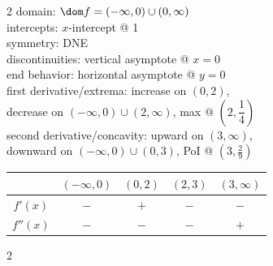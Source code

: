 \documentclass{book}
\begin{document}
\begin{appendices}
\begin{enumerate}[!HW!]
\begin{multicols}{2}
domain: $\dom f = (-\infty,0)\cup(0,\infty)$ \\
intercepts: $x$-intercept @ 1\\
symmetry: DNE \\ 
discontinuities: vertical asymptote @ $x=0$\\
end behavior: horizontal asymptote @ $y=0$\\
first derivative/extrema: increase on $(0,2)$,\\ decrease on $(-\infty,0)\cup(2,\infty)$, max @ $\left(2,\dfrac{1}{4}\right)$\\
second derivative/concavity: upward on $(3,\infty)$,\\ downward on $(-\infty,0)\cup (0,3)$, PoI @ $\left(3,\frac{2}{9}\right)$\vspace{-15pt}
\begin{center}
\begin{tabular}{c|c|c|c|c}
 & $(-\infty, 0)$ & $(0, 2)$ & $(2,3)$ & $(3,\infty)$ \\ \hline
$f'(x)$ & $-$ & $+$ & $-$ & $-$\\ 
$f''(x)$ & $-$ & $-$ & $-$ & $+$ \\ 
\end{tabular}
\end{center} 
\end{multicols}

\itemspade \mbox{}\vspace{-25pt}

\begin{multicols}{2}
\columnbreak


\end{multicols}
\end{enumerate}
\end{appendices}
\end{document}
